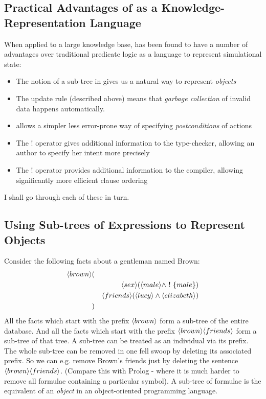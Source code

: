 \subsection{Practical Advantages of \ELABR{} as a Knowledge-Representation Language}

When applied to a large knowledge base, \ELFULL{} has been found to have a number of advantages over traditional predicate logic as a language to represent simulational state:
\begin{itemize}
\item
The notion of a sub-tree in \ELABR{} gives us a natural way to represent \emph{objects}
\item
The update rule (described above) means that \emph{garbage collection} of invalid data happens automatically.
\item
\ELABR{} allows a simpler less error-prone way of specifying \emph{postconditions} of actions
\item
The $!$ operator gives additional information to the type-checker, allowing an author to specify her intent more precisely
\item
The $!$ operator provides additional information to the compiler, allowing significantly more efficient clause ordering
\end{itemize}
I shall go through each of these in turn.

\subsection{Using Sub-trees of Expressions to Represent Objects}
Consider the following facts about a gentleman named Brown:
\begin{eqnarray*}
\MAY{brown} & ( & \\
& & \MAY{sex} (\MAY{male} \land \fBang \{male\}) \\
& & \MAY{friends} (\MAY{lucy} \land \MAY{elizabeth}) \\
& )
\end{eqnarray*}
All the facts which start with the prefix $\MAY{brown}$ form a sub-tree of the entire database.
And all the facts which start with the prefix $\MAY{brown} \MAY{friends}$ form a sub-tree of that tree.
A sub-tree can be treated as an individual via its prefix.
The whole sub-tree can be removed in one fell swoop by deleting its associated prefix.
So we can e.g. remove Brown's friends just by deleting the sentence $\MAY{brown} \MAY{friends}$.
(Compare this with Prolog - where it is much harder to remove all formulae containing a particular symbol).
A sub-tree of formulae is the \ELABR{} equivalent of an \emph{object} in an object-oriented programming language.

